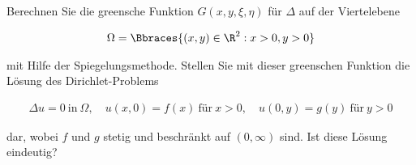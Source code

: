 
\begin{exercise}

Berechnen Sie die greensche Funktion $G(x, y, \xi, \eta)$ für $\Delta$ auf der Viertelebene

\begin{align*}
  \Omega
  =
  \Bbraces{(x, y) \in \R^2: x > 0, y > 0}
\end{align*}

mit Hilfe der Spiegelungsmethode.
  Stellen Sie mit dieser greenschen Funktion die Lösung des Dirichlet-Problems

\begin{align*}
  \Delta u = 0 ~\text{in}~ \Omega,
  \quad
  u(x, 0) = f(x) ~\text{für}~ x > 0,
  \quad
  u(0, y) = g(y) ~\text{für}~ y > 0
\end{align*}

dar, wobei $f$ und $g$ stetig und beschränkt auf $(0, \infty)$ sind. Ist diese Lösung eindeutig?

\end{exercise}


